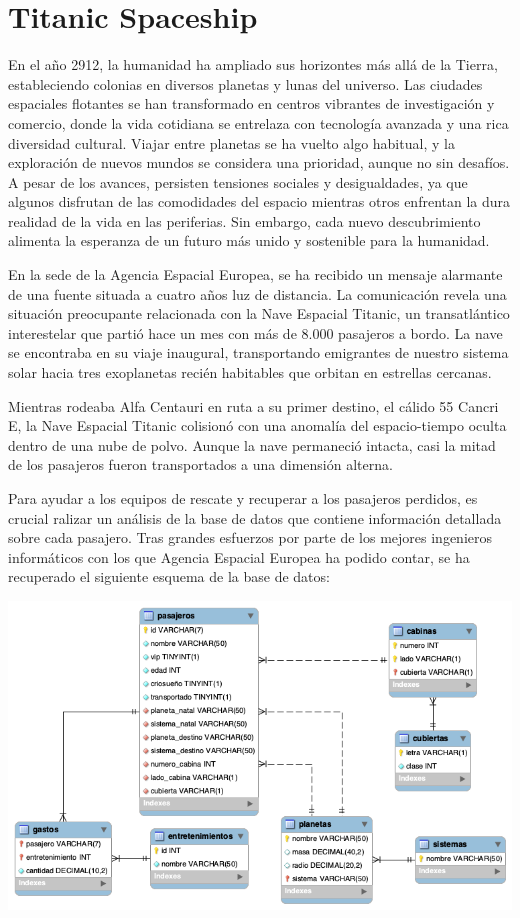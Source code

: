 \documentclass{db-practice}
\begin{document}
\section{Titanic Spaceship}

En el año 2912, la humanidad ha ampliado sus horizontes más allá de la Tierra, estableciendo colonias en diversos planetas y lunas del universo. Las ciudades espaciales flotantes se han transformado en centros vibrantes de investigación y comercio, donde la vida cotidiana se entrelaza con tecnología avanzada y una rica diversidad cultural. Viajar entre planetas se ha vuelto algo habitual, y la exploración de nuevos mundos se considera una prioridad, aunque no sin desafíos. A pesar de los avances, persisten tensiones sociales y desigualdades, ya que algunos disfrutan de las comodidades del espacio mientras otros enfrentan la dura realidad de la vida en las periferias. Sin embargo, cada nuevo descubrimiento alimenta la esperanza de un futuro más unido y sostenible para la humanidad.

En la sede de la Agencia Espacial Europea, se ha recibido un mensaje alarmante de una fuente situada a cuatro años luz de distancia. La comunicación revela una situación preocupante relacionada con la Nave Espacial Titanic, un transatlántico interestelar que partió hace un mes con más de 8.000 pasajeros a bordo. La nave se encontraba en su viaje inaugural, transportando emigrantes de nuestro sistema solar hacia tres exoplanetas recién habitables que orbitan en estrellas cercanas.

Mientras rodeaba Alfa Centauri en ruta a su primer destino, el cálido 55 Cancri E, la Nave Espacial Titanic colisionó con una anomalía del espacio-tiempo oculta dentro de una nube de polvo. Aunque la nave permaneció intacta, casi la mitad de los pasajeros fueron transportados a una dimensión alterna.

Para ayudar a los equipos de rescate y recuperar a los pasajeros perdidos, es crucial ralizar un análisis de la base de datos que contiene información detallada sobre cada pasajero. Tras grandes esfuerzos por parte de los mejores ingenieros informáticos con los que Agencia Espacial Europea ha podido contar, se ha recuperado el siguiente esquema de la base de datos:

\includegraphics[width=\textwidth]{figs/sql/titanic-spaceship-diagram.png}
\end{document}

